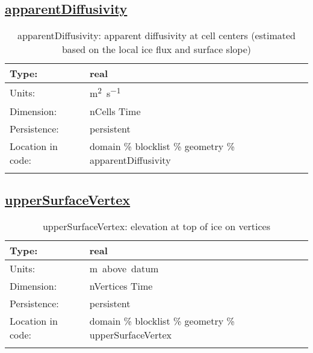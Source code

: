 \subsection[apparentDiffusivity]{\hyperref[sec:var_tab_geometry]{apparentDiffusivity}}
\label{subsec:var_sec_geometry_apparentDiffusivity}
\begin{center}
\begin{longtable}{| p{2.0in} | p{4.0in} |}
        \hline 
        Type: & real \\
        \hline 
        Units: & \si{m^2.s^{-1}} \\
        \hline 
        Dimension: & nCells Time \\
        \hline 
        Persistence: & persistent \\
        \hline 
         Location in code: & domain \% blocklist \% geometry \% apparentDiffusivity \\
         \hline 
    \caption{apparentDiffusivity: apparent diffusivity at cell centers (estimated based on the local ice flux and surface slope)}
\end{longtable}
\end{center}
\subsection[upperSurfaceVertex]{\hyperref[sec:var_tab_geometry]{upperSurfaceVertex}}
\label{subsec:var_sec_geometry_upperSurfaceVertex}
\begin{center}
\begin{longtable}{| p{2.0in} | p{4.0in} |}
        \hline 
        Type: & real \\
        \hline 
        Units: & \si{m.above.datum} \\
        \hline 
        Dimension: & nVertices Time \\
        \hline 
        Persistence: & persistent \\
        \hline 
         Location in code: & domain \% blocklist \% geometry \% upperSurfaceVertex \\
         \hline 
    \caption{upperSurfaceVertex: elevation at top of ice on vertices}
\end{longtable}
\end{center}
